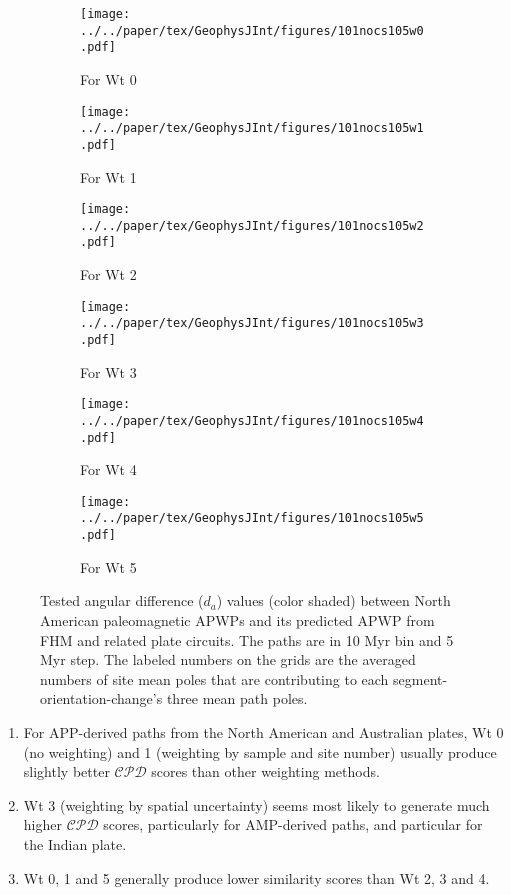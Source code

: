 \begin{figure*}
	\centering
	\begin{subfigure}{.495\textwidth}
		\texttt{[image: ../../paper/tex/GeophysJInt/figures/101nocs105w0.pdf]}
		\caption{For Wt 0}\label{fig-na-daw0}
	\end{subfigure}
	\vspace{.1em}
	\begin{subfigure}{.495\textwidth}
		\texttt{[image: ../../paper/tex/GeophysJInt/figures/101nocs105w1.pdf]}
		\caption{For Wt 1}\label{fig-na-daw1}
	\end{subfigure}
	\vspace{.1em}
	\begin{subfigure}{.495\textwidth}
		\texttt{[image: ../../paper/tex/GeophysJInt/figures/101nocs105w2.pdf]}
		\caption{For Wt 2}\label{fig-na-daw2}
	\end{subfigure}
	\vspace{.1em}
	\begin{subfigure}{.495\textwidth}
		\texttt{[image: ../../paper/tex/GeophysJInt/figures/101nocs105w3.pdf]}
		\caption{For Wt 3}\label{fig-na-daw3}
	\end{subfigure}
	\vspace{.1em}
	\begin{subfigure}{.495\textwidth}
		\texttt{[image: ../../paper/tex/GeophysJInt/figures/101nocs105w4.pdf]}
		\caption{For Wt 4}\label{fig-na-daw4}
	\end{subfigure}
	\vspace{.1em}
	\begin{subfigure}{.495\textwidth}
		\texttt{[image: ../../paper/tex/GeophysJInt/figures/101nocs105w5.pdf]}
		\caption{For Wt 5}\label{fig-na-daw5}
	\end{subfigure}
	\caption[$d_a$ of each pair of segment-oreintation-changes for North American
10/5 Myr APWPs]{Tested angular difference ($d_a$) values (color shaded) between
North American paleomagnetic APWPs and its predicted APWP from FHM and related
plate circuits. The paths are in 10 Myr bin and 5 Myr step. The labeled numbers
on the grids are the averaged numbers of site mean poles that are contributing
to each segment-orientation-change's three mean path poles.}\label{fig-nada}
\end{figure*}
%
\begin{enumerate}
  \item For APP-derived paths from the North American and Australian plates,
		Wt 0 (no weighting) and 1 (weighting by sample and site
		number) usually produce slightly better $\mathcal{CPD}$ scores than
		other weighting methods.
  \item Wt 3 (weighting by spatial uncertainty) seems most likely
		to generate much higher $\mathcal{CPD}$ scores, particularly for
		AMP-derived paths, and particular for the Indian plate.
  \item Wt 0, 1 and 5 generally produce lower similarity scores than Wt 2, 3 and
		4.
\end{enumerate}

